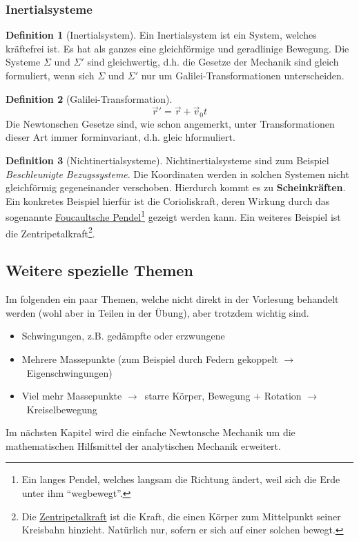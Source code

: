 \documentclass[oneside]{book}
\theoremstyle{definition}
\newtheorem*{definition*}{Definition}
\newcommand{\conseq}{$\rightarrow$~}
\begin{document}
\subsubsection{Inertialsysteme}
\begin{definition*}[Inertialsystem]
	Ein Inertialsystem ist ein System, welches kräftefrei ist. Es hat als ganzes eine gleichförmige und geradlinige Bewegung.
Die Systeme $\Sigma$ und $\Sigma'$ sind gleichwertig, d.h. die Gesetze der Mechanik sind gleich formuliert, wenn sich $\Sigma$ und $\Sigma'$ nur um Galilei-Transformationen unterscheiden.
\end{definition*}

\begin{definition*}[Galilei-Transformation]
$$ \vec{r}' = \vec{r} + \vec{v}_0t$$
Die Newtonschen Gesetze sind, wie schon angemerkt, unter Transformationen dieser Art immer forminvariant, d.h. gleic hformuliert.
\end{definition*}

\begin{definition*}[Nichtinertialsysteme]
	Nichtinertialsysteme sind zum Beispiel \textit{Beschleunigte Bezugssysteme}. Die Koordinaten werden in solchen Systemen nicht gleichförmig gegeneinander verschoben. Hierdurch kommt es zu \textbf{Scheinkräften}. Ein konkretes Beispiel hierfür ist die Corioliskraft, deren Wirkung durch das sogenannte \href{https://de.wikipedia.org/wiki/Foucaultsches_Pendel}{Foucaultsche Pendel}\footnote{Ein langes Pendel, welches langsam die Richtung ändert, weil sich die Erde unter ihm "`wegbewegt"'.} gezeigt werden kann. Ein weiteres Beispiel ist die Zentripetalkraft\footnote{Die \href{http://de.wikipedia.org/wiki/Zentripetalkraft}{Zentripetalkraft} ist die Kraft, die einen Körper zum Mittelpunkt seiner Kreisbahn hinzieht. Natürlich nur, sofern er sich auf einer solchen bewegt.}.
\end{definition*}


\subsection{Weitere spezielle Themen}
Im folgenden ein paar Themen, welche nicht direkt in der Vorlesung behandelt werden (wohl aber in Teilen in der Übung), aber trotzdem wichtig sind.
\begin{itemize}
	\item Schwingungen, z.B. gedämpfte oder erzwungene
	\item Mehrere Massepunkte (zum Beispiel durch Federn gekoppelt \conseq Eigenschwingungen) 
	\item Viel mehr Massepunkte \conseq starre Körper, Bewegung $+$ Rotation \conseq Kreiselbewegung
\end{itemize}
Im nächsten Kapitel wird die einfache Newtonsche Mechanik um die mathematischen Hilfsmittel der analytischen Mechanik erweitert.
\end{document}
